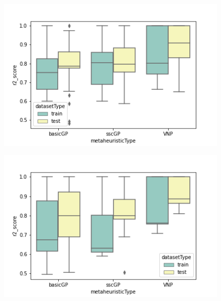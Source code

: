 \documentclass[main.tex]{subfiles}
\begin{document}
\begin{figure}
\centering
\begin{minipage}{.5\textwidth}
  \centering
  \includegraphics[width=1.1\linewidth]{../images/f02.png}
  \label{fig:f02}
\end{minipage}%
\begin{minipage}{.5\textwidth}
  \centering
  \includegraphics[width=1.1\linewidth]{../images/f03.png}
  \label{fig:f03}
\end{minipage}
\end{figure}
\end{document}
